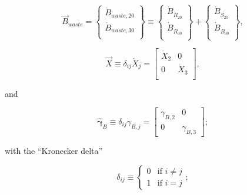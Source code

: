 \begin{equation} \label{eq:waste_vec_def}
	\vec{B}_{waste} 
	=
	\begin{Bmatrix}
		\dot{B}_{waste,{20}}	\\
		\dot{B}_{waste,{30}}	\\
	\end{Bmatrix}
	\equiv
	\begin{Bmatrix}
		\dot{B}_{\dot{R}_{20}}	\\
		\dot{B}_{\dot{R}_{30}}	\\
	\end{Bmatrix}
	+
	\begin{Bmatrix}
		\dot{B}_{\dot{S}_{20}}	\\
		\dot{B}_{\dot{B}_{30}}	\\
	\end{Bmatrix},
\end{equation} 

\begin{equation} \label{eq:X_hat_matrix_def}
	\hat{\vec{X}} 
	\equiv
	\delta_{ij} \dot{X}_{j} 
	= 
	\begin{bmatrix}
		\dot{X}_{2}		&	0	  \\
		0				&	\dot{X}_{3}	\\
	\end{bmatrix},
\end{equation} 

\noindent{}and

\begin{equation} \label{eq:gamma_hat_matrix_def}
	\hat{\bm{\gamma}}_{B}
	\equiv
	\delta_{ij} \gamma_{B,j}
	=
	\begin{bmatrix}
		\gamma_{B,2} & 0         \\
		0            & \gamma_{B,3}
	\end{bmatrix};
\end{equation}

\noindent{}with the ``Kronecker delta''

\begin{equation}\label{eq:k_delta}
	\delta_{ij} 
	\equiv
	\begin{cases}	
		0	&	\text{if  } i \neq j	\\
		1 	& 	\text{if  } i = j
	\end{cases};
\end{equation}

